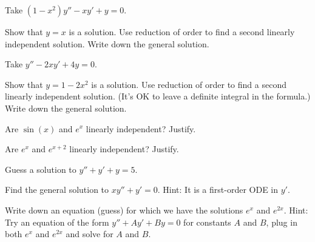 \begin{exercise}
Take 
$(1-x^2)y''-xy' + y = 0$.
\begin{tasks}
\task Show that $y=x$ is a solution.
\task Use reduction of order to find a second linearly independent solution.
\task Write down the general solution.
\end{tasks}
\end{exercise}

\begin{exercise}
Take 
$y''-2xy' + 4y = 0$.
\begin{tasks}
\task Show that $y=1-2x^2$ is a solution.  
\task Use reduction of order to find a second linearly independent solution.
(It's OK to leave a definite integral in the formula.)
\task Write down the general solution.
\end{tasks}
\end{exercise}

\setcounter{exercise}{100}

\begin{exercise}
Are $\sin(x)$ and $e^x$ linearly independent?  Justify.
\end{exercise}

\begin{exercise}
Are $e^x$ and $e^{x+2}$ linearly independent?  Justify.
\end{exercise}

\begin{exercise}
Guess a solution to $y'' + y' + y= 5$.
\end{exercise}

\begin{exercise}
Find the general solution to
$x y'' + y' = 0$.  Hint: It is a first-order ODE in $y'$.
\end{exercise}

\begin{exercise}
Write down an equation (guess) for which we have the solutions
$e^x$ and $e^{2x}$.  Hint: Try an equation of the form
$y''+Ay'+By = 0$ for constants $A$ and $B$,
plug in both $e^x$ and $e^{2x}$ and solve for $A$ and $B$.
\end{exercise}



